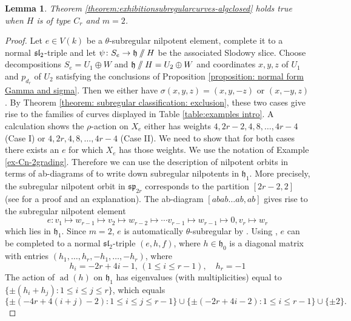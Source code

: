 \documentclass{article} %
\newtheorem{lemma}[proposition]{Lemma}
\numberwithin{equation}{section}
\theoremstyle{definition}
\newcommand{\GIT}{\mathbin{/\mkern-6mu/}}
\newcommand{\frakh}{\mathfrak h}
\newcommand{\fraksl}{\mathfrak{sl}}
\DeclareMathOperator{\ad}{ad}
\newcommand{\rl}{r} %
\begin{document}
\begin{lemma}\label{lemma: subregular curves m2 Cn}
    Theorem \ref{theorem:exhibitionsubregularcurves-algclosed} holds true when $H$ is of type $C_\rl$ and $m=2$.
\end{lemma}
\begin{proof}
    Let $e\in V(k)$ be a $\theta$-subregular nilpotent element, complete it to a normal $\frak{sl}_2$-triple and let $\psi\colon S_e\rightarrow \frakh\GIT H$ be the associated Slodowy slice.
    Choose decompositions $S_e = U_1 \oplus W$ and $\frakh \GIT H = U_2 \oplus W$ and coordinates $x,y,z$ of $U_1$ and $p_{d_r}$ of $U_2$ satisfying the conclusions of Proposition \ref{proposition: normal form Gamma and sigma}.
    Then we either have $\sigma(x,y,z) = (x,y,-z)$ or $(x,-y,z)$.
    By Theorem \ref{theorem: subregular classification: exclusion}, these two cases give rise to the families of curves displayed in Table \ref{table:examples intro}.
    A calculation shows the $\rho$-action on $X_e$ either has weights $4,2\rl-2,4,8,\dots, 4\rl-4$ (Case I) or $4,2\rl,4,8,\dots,4\rl-4$ (Case II).
    We need to show that for both cases there exists an $e$ for which $X_e$ has those weights.
    We use the notation of Example \ref{ex-Cn-2grading}.
Therefore we can use the description of nilpotent orbits in terms of ab-diagrams of \cite[p. 305, Proposition 2]{Ohta-classificationadmissiblenilpotent} to write down subregular nilpotents in $\frakh_1$.
More precisely, the subregular nilpotent orbit in $\mathfrak{sp}_{2\rl}$ corresponds to the partition $[2\rl-2,2]$ (see \cite[Section 5.1 and 5.4]{CollingwoodMcGovern-nilpotentorbits} for a proof and an explanation). 
The ab-diagram $[abab\dots ab,ab]$ gives rise to the subregular nilpotent element 
\[
e: v_1\mapsto w_{\rl-1}\mapsto v_2 \mapsto w_{\rl-2} \mapsto \cdots v_{\rl-1}\mapsto w_{\rl-1}\mapsto 0, v_\rl\mapsto w_\rl
\]
which lies in $\frakh_1$.
Since $m=2$, $e$ is automatically $\theta$-subregular by \cite[Lemma 2.21]{Thorne-thesis}.
Using \cite[Case (CI) of Section (4.2) and Section (3.1), Lemma 4]{Ohta-classificationadmissiblenilpotent}, $e$ can be completed to a normal $\fraksl_2$-triple $(e,h,f)$, where $h \in \frakh_0$ is a diagonal matrix with entries $(h_1, \dots, h_\rl, -h_1, \dots, -h_\rl)$, where
\[
h_i = -2\rl+4i-1 ,\, (1\leq i \leq \rl-1), \quad h_\rl = -1
\]
The action of $\ad(h)$ on $\frakh_1$ has eigenvalues (with multiplicities) equal to $\{\pm (h_i + h_j) \colon 1\leq i\leq j \leq \rl\}$, which equals
\[\{\pm(-4\rl + 4(i+j)-2) \colon 1\leq i\leq j\leq \rl-1  \}
\cup
\{ \pm (-2\rl+4i-2) \colon 1\leq i\leq \rl-1\} \cup \{\pm 2\}.\]

\end{proof}
\end{document}
